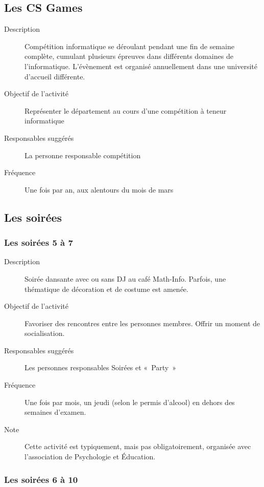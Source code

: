 \documentclass{aediroum}
\begin{document}
\subsection{Les CS Games}\label{sec:cs-games}

\begin{description}
    \item[Description] Compétition informatique se déroulant pendant une fin de semaine complète, cumulant plusieurs épreuves dans différents domaines de l'informatique. L'évènement est organisé annuellement dans une université d'accueil différente.
    \item[Objectif de l'activité] Représenter le département au cours d'une compétition à teneur informatique
    \item[Responsables suggérés] La personne responsable compétition
    \item[Fréquence] Une fois par an, aux alentours du mois de mars
\end{description}

\subsection{Les soirées}\label{sec:soirees}

\subsubsection{Les soirées 5 à 7}\label{sec:5-a-7}

\begin{description}
    \item[Description] Soirée dansante avec ou sans DJ au café Math-Info. Parfois, une thématique de décoration et de costume est amenée.
    \item[Objectif de l'activité] Favoriser des rencontres entre les personnes membres. Offrir un moment de socialisation.
    \item[Responsables suggérés] Les personnes responsables Soirées et «~Party~»
    \item[Fréquence] Une fois par mois, un jeudi (selon le permis d'alcool) en dehors des semaines d'examen.
    \item[Note] Cette activité est typiquement, mais pas obligatoirement, organisée avec l'association de Psychologie et Éducation.
\end{description}

\subsubsection{Les soirées 6 à 10}\label{sec:6-a-10}
\end{document}
